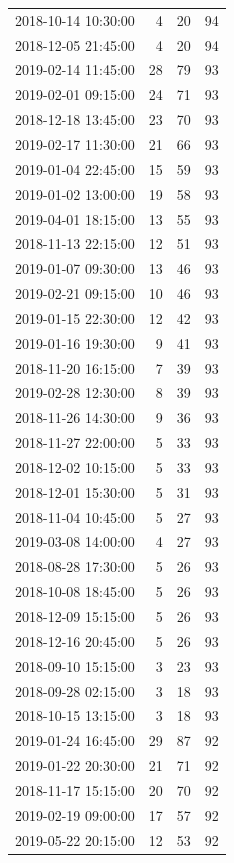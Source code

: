 \begin{tabular}{lrrr}
2018-10-14 10:30:00 & 4 & 20 & 94 \\
2018-12-05 21:45:00 & 4 & 20 & 94 \\
2019-02-14 11:45:00 & 28 & 79 & 93 \\
2019-02-01 09:15:00 & 24 & 71 & 93 \\
2018-12-18 13:45:00 & 23 & 70 & 93 \\
2019-02-17 11:30:00 & 21 & 66 & 93 \\
2019-01-04 22:45:00 & 15 & 59 & 93 \\
2019-01-02 13:00:00 & 19 & 58 & 93 \\
2019-04-01 18:15:00 & 13 & 55 & 93 \\
2018-11-13 22:15:00 & 12 & 51 & 93 \\
2019-01-07 09:30:00 & 13 & 46 & 93 \\
2019-02-21 09:15:00 & 10 & 46 & 93 \\
2019-01-15 22:30:00 & 12 & 42 & 93 \\
2019-01-16 19:30:00 & 9 & 41 & 93 \\
2018-11-20 16:15:00 & 7 & 39 & 93 \\
2019-02-28 12:30:00 & 8 & 39 & 93 \\
2018-11-26 14:30:00 & 9 & 36 & 93 \\
2018-11-27 22:00:00 & 5 & 33 & 93 \\
2018-12-02 10:15:00 & 5 & 33 & 93 \\
2018-12-01 15:30:00 & 5 & 31 & 93 \\
2018-11-04 10:45:00 & 5 & 27 & 93 \\
2019-03-08 14:00:00 & 4 & 27 & 93 \\
2018-08-28 17:30:00 & 5 & 26 & 93 \\
2018-10-08 18:45:00 & 5 & 26 & 93 \\
2018-12-09 15:15:00 & 5 & 26 & 93 \\
2018-12-16 20:45:00 & 5 & 26 & 93 \\
2018-09-10 15:15:00 & 3 & 23 & 93 \\
2018-09-28 02:15:00 & 3 & 18 & 93 \\
2018-10-15 13:15:00 & 3 & 18 & 93 \\
2019-01-24 16:45:00 & 29 & 87 & 92 \\
2019-01-22 20:30:00 & 21 & 71 & 92 \\
2018-11-17 15:15:00 & 20 & 70 & 92 \\
2019-02-19 09:00:00 & 17 & 57 & 92 \\
2019-05-22 20:15:00 & 12 & 53 & 92 \\

\end{tabular}
